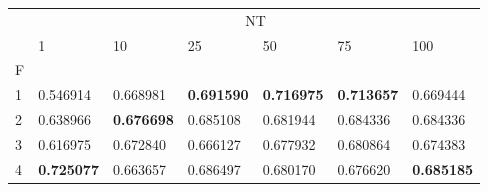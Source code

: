 \begin{table}[htbp]
\centering
\label{nursery-results}
\begin{tabular}{lllllll}
\toprule
 & \multicolumn{6}{c}{NT} \\
 & 1 & 10 & 25 & 50 & 75 & 100 \\
F &  &  &  &  &  &  \\
\midrule
1 & 0.546914 & 0.668981 & \textbf{0.691590} & \textbf{0.716975} & \textbf{0.713657} & 0.669444 \\
2 & 0.638966 & \textbf{0.676698} & 0.685108 & 0.681944 & 0.684336 & 0.684336 \\
3 & 0.616975 & 0.672840 & 0.666127 & 0.677932 & 0.680864 & 0.674383 \\
4 & \textbf{0.725077} & 0.663657 & 0.686497 & 0.680170 & 0.676620 & \textbf{0.685185} \\
\bottomrule
\end{tabular}
\end{table}
